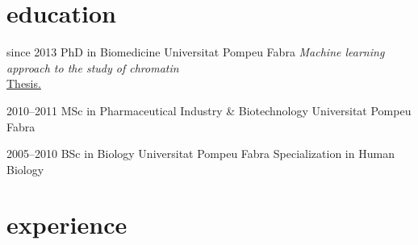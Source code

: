 \documentclass[]{friggeri-cv} %
\begin{document}
\section{education}

\begin{entrylist}

\entry
{since 2013}
{PhD {\normalfont in Biomedicine}}
{Universitat Pompeu Fabra}
{\emph{Machine learning approach to the study of chromatin}\\
\href{https://www.tdx.cat/handle/10803/565685}{{\FA \faExternalLink} Thesis.}}

\entry
{2010--2011}
{MSc {\normalfont in Pharmaceutical Industry \& Biotechnology}}
{Universitat Pompeu Fabra}
{}

\entry
{2005--2010}
{BSc {\normalfont in Biology}}
{Universitat Pompeu Fabra}
{Specialization in Human Biology}

\end{entrylist}


\section{experience}
\end{document}
